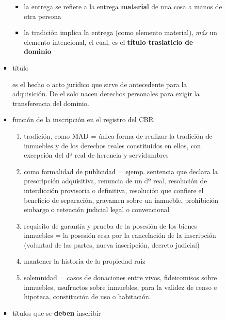 \documentclass[]{article}
\providecommand{\tightlist}{%
  \setlength{\itemsep}{0pt}\setlength{\parskip}{0pt}}
\begin{document}
\begin{itemize}
\begin{itemize}
\begin{itemize}
      \begin{itemize}
      \tightlist
      \item
        la entrega se refiere a la entrega \textbf{material} de una cosa
        a manos de otra persona
      \item
        la tradición implica la entrega (como elemento material),
        \emph{más} un elemento intencional, el cual, es el
        \textbf{título traslaticio de dominio}
      \end{itemize}
    \item
      título

      es el hecho o acto jurídico que sirve de antecedente para la
      adquisición. De el solo nacen derechos personales para exigir la
      transferencia del dominio.
    \item
      función de la inscripción en el registro del CBR

      \begin{enumerate}
      \def\labelenumi{\arabic{enumi}.}
      \tightlist
      \item
        tradición, como MAD = única forma de realizar la tradición de
        inmuebles y de los derechos reales constituidos en ellos, con
        excepción del dº real de herencia y servidumbres
      \item
        como formalidad de publicidad = ejemp. sentencia que declara la
        prescripción adquisitiva, renuncia de un dº real, resolución de
        interdicción provisoria o definitiva, resolución que confiere el
        beneficio de separación, gravamen sobre un inmueble, prohibición
        embargo o retención judicial legal o convencional
      \item
        requisito de garantía y prueba de la posesión de los bienes
        inmuebles = la posesión cesa por la cancelación de la
        inscripción (voluntad de las partes, nueva inscripción, decreto
        judicial)
      \item
        mantener la historia de la propiedad raíz
      \item
        solemnidad = casos de donaciones entre vivos, fideicomisos sobre
        inmuebles, usufructos sobre inmuebles, para la validez de censo
        e hipoteca, constitución de uso o habitación.
      \end{enumerate}
    \item
      títulos que se \textbf{deben} inscribir


\end{itemize}
\end{itemize}
\end{itemize}
\end{document}
